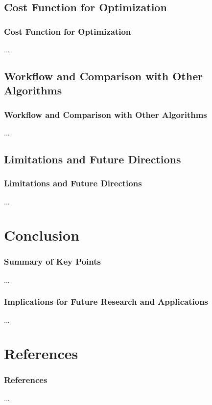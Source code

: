 \documentclass[aspectratio=1610]{beamer}
\begin{document}
\subsection{Cost Function for Optimization}
\begin{frame}
\frametitle{Cost Function for Optimization}
...
\end{frame}

\subsection{Workflow and Comparison with Other Algorithms}
\begin{frame}
\frametitle{Workflow and Comparison with Other Algorithms}
...
\end{frame}

\subsection{Limitations and Future Directions}
\begin{frame}
\frametitle{Limitations and Future Directions}
...
\end{frame}

\section{Conclusion}
\begin{frame}
\frametitle{Summary of Key Points}
...
\end{frame}

\begin{frame}
\frametitle{Implications for Future Research and Applications}
...
\end{frame}

\section{References}
\begin{frame}
\frametitle{References}
...
\end{frame}
\end{document}
